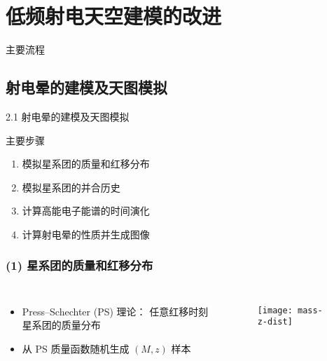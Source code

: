\documentclass{beamer}
\begin{document}
\section{低频射电天空建模的改进}

\begin{frame}
  \begin{block}{主要流程}
    \vspace{-1ex}
    \begin{figure}
    \end{figure}
  \end{block}
\end{frame}

\subsection{射电晕的建模及天图模拟}

\begin{frame}{2.1 射电晕的建模及天图模拟}
  \begin{alertblock}{主要步骤}
    \begin{enumerate}
      \item 模拟星系团的质量和红移分布
      \item 模拟星系团的并合历史
      \item 计算高能电子能谱的时间演化
      \item 计算射电晕的性质并生成图像
    \end{enumerate}
  \end{alertblock}
\end{frame}

\begin{frame}[subsec]
  \frametitle{(1) 星系团的质量和红移分布}
  \begin{columns}[t,onlytextwidth]
    \begin{itemize}
      \item Press--Schechter (PS) 理论：
        任意红移时刻星系团的质量分布
      \item 从 PS 质量函数随机生成 $(M, z)$ 样本
    \end{itemize}

    \begin{figure}
      \centering
      \texttt{[image: mass-z-dist]}
    \end{figure}
  \end{columns}
\end{frame}
\end{document}

